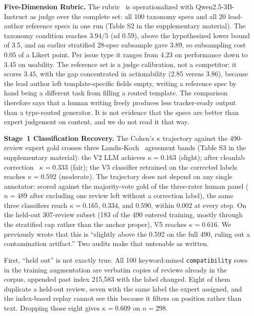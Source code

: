 \documentclass[11pt]{article}
\begin{document}
\textbf{Five-Dimension Rubric.} The rubric~\cite{gilardi2023chatgpt, pangakis2023automated,
zheng2023judging} is operationalized with Qwen2.5-3B-Instruct as judge over the complete set: all
100 taxonomy specs and all 20 lead-author reference specs in one run (Table S2 in the supplementary material). The
taxonomy condition reaches $3.94/5$ (sd 0.59), above the hypothesized lower bound of 3.5, and an
earlier stratified 28-spec subsample gave $3.89$, so subsampling cost $0.05$ of a Likert point.
Per issue type it ranges from 4.23 on performance down to 3.45 on usability. The reference set is
a judge calibration, not a competitor: it scores $3.45$, with the gap concentrated in
actionability (2.85 versus 3.86), because the lead author left template-specific fields empty,
writing a reference spec by hand being a different task from filling a routed template. The
comparison therefore says that a human writing freely produces less tracker-ready output than a
type-routed generator. It is not evidence that the specs are better than expert judgement on
content, and we do not read it that way.





\textbf{Stage~1 Classification Recovery.} The Cohen's $\kappa$ trajectory against the 490-review
expert gold crosses three Landis-Koch~\cite{landis1977measurement} agreement bands
(Table S3 in the supplementary material): the V2 LLM achieves $\kappa = 0.163$ (slight); after cleanlab
correction~\cite{northcutt2021confident} $\kappa = 0.333$ (fair); the V5 classifier retrained on
the corrected labels reaches $\kappa = 0.592$ (moderate). The trajectory does not depend on any
single annotator: scored against the majority-vote gold of the three-rater human panel ($n = 489$
after excluding one review left without a correction label), the same three classifiers reach
$\kappa = 0.165$, $0.334$, and $0.590$, within $0.002$ at every step. On the held-out 307-review
subset (183 of the 490 entered training, mostly through the stratified cap rather than the anchor
proper), V5 reaches $\kappa = 0.616$. We previously wrote that this is ``slightly above the 0.592
on the full 490, ruling out a contamination artifact.'' Two audits make that untenable as written.

First, ``held out'' is not exactly true. All 100 keyword-mined \texttt{compatibility} rows in the
training augmentation are verbatim copies of reviews already in the corpus, appended past index
215{,}583 with the label changed. Eight of them duplicate a held-out review, seven with the same
label the expert assigned, and the index-based replay cannot see this because it filters on
position rather than text. Dropping those eight gives $\kappa = 0.609$ on $n = 298$.
\end{document}
